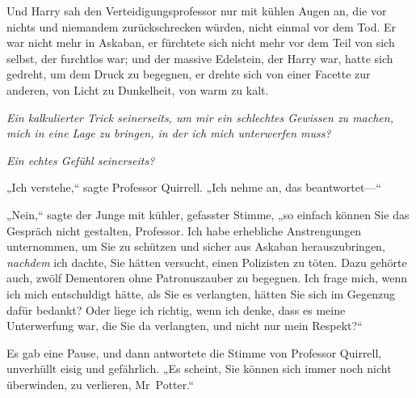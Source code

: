 Und Harry sah den Verteidigungsprofessor nur mit kühlen Augen an, die vor nichts und niemandem zurückschrecken würden, nicht einmal vor dem Tod. Er war nicht mehr in Askaban, er fürchtete sich nicht mehr vor dem Teil von sich selbst, der furchtlos war; und der massive Edelstein, der Harry war, hatte sich gedreht, um dem Druck zu begegnen, er drehte sich von einer Facette zur anderen, von Licht zu Dunkelheit, von warm zu kalt.

\emph{Ein kalkulierter Trick seinerseits, um mir ein schlechtes Gewissen zu machen, mich in eine Lage zu bringen, in der ich mich unterwerfen muss?}

\emph{Ein echtes Gefühl seinerseits?}

„Ich verstehe,“ sagte Professor Quirrell. „Ich nehme an, das beantwortet—“

„Nein,“ sagte der Junge mit kühler, gefasster Stimme, „so einfach können Sie das Gespräch nicht gestalten, Professor. Ich habe erhebliche Anstrengungen unternommen, um Sie zu schützen und sicher aus Askaban herauszubringen, \emph{nachdem} ich dachte, Sie hätten versucht, einen Polizisten zu töten. Dazu gehörte auch, zwölf Dementoren ohne Patronuszauber zu begegnen. Ich frage mich, wenn ich mich entschuldigt hätte, als Sie es verlangten, hätten Sie sich im Gegenzug dafür bedankt? Oder liege ich richtig, wenn ich denke, dass es meine Unterwerfung war, die Sie da verlangten, und nicht nur mein Respekt?“

Es gab eine Pause, und dann antwortete die Stimme von Professor Quirrell, unverhüllt eisig und gefährlich. „Es scheint, Sie können sich immer noch nicht überwinden, zu verlieren, Mr~Potter.“

